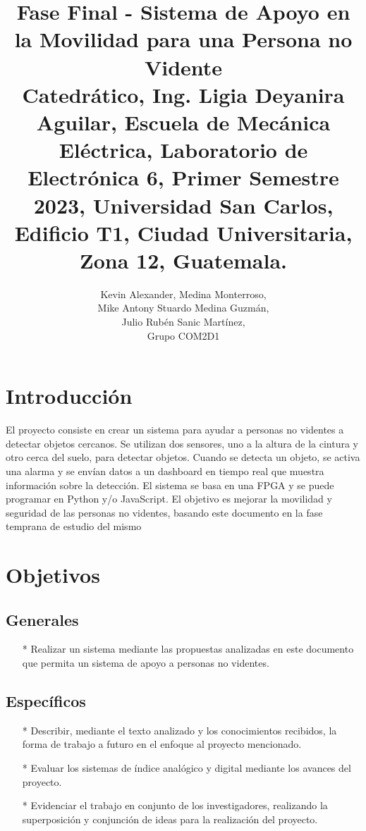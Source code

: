 \documentclass[journal]{IEEEtran}
\author{
    Kevin Alexander, Medina Monterroso,\IEEEmembership{ 2019-02084}\\
    Mike Antony Stuardo Medina Guzmán,\IEEEmembership{2019-03908} \\
    Julio Rubén Sanic Martínez,\IEEEmembership{2012-22286}\\Grupo COM2D1

}
\title{\textbf{Fase Final -  Sistema de Apoyo en la
        Movilidad para una Persona no Vidente}\\
    \small{
        Catedrático, Ing. Ligia Deyanira Aguilar, Escuela de Mecánica Eléctrica, Laboratorio de Electrónica 6, Primer Semestre 2023, Universidad San Carlos, Edificio T1, Ciudad Universitaria, Zona 12, Guatemala.
    }}
\begin{document}
\maketitle

\section{Introducción}

El proyecto consiste en crear un sistema para ayudar a personas no videntes a
detectar objetos cercanos. Se utilizan dos sensores, uno a la altura de la
cintura y otro cerca del suelo, para detectar objetos. Cuando se detecta un
objeto, se activa una alarma y se envían datos a un dashboard en tiempo real
que muestra información sobre la detección. El sistema se basa en una FPGA y se
puede programar en Python y/o JavaScript. El objetivo es mejorar la movilidad y
seguridad de las personas no videntes, basando este documento en la fase
temprana de estudio del mismo


\section{Objetivos}

\subsection{Generales}

\begin{itemize}
\item[*] Realizar un sistema mediante las propuestas analizadas en este documento que permita un sistema de apoyo a personas no videntes.
\end{itemize}

\subsection{Específicos}

\begin{itemize}
\item[*] Describir, mediante el texto analizado y los conocimientos recibidos, la forma de trabajo a futuro en el enfoque al proyecto mencionado.

\item[*] Evaluar los sistemas de índice analógico y digital mediante los avances del proyecto.

\item[*] Evidenciar el trabajo en conjunto de los investigadores, realizando la superposición y conjunción de ideas para la realización del proyecto.

\end{itemize}
\end{document}
